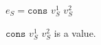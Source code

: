 \begin{case}

$e_{S}=\mathtt{cons}$ $v_{S}^{1}$ $v_{S}^{2}$

$\mathtt{cons}$ $v_{S}^{1}$ $v_{S}^{2}$ is a value.

\end{case}